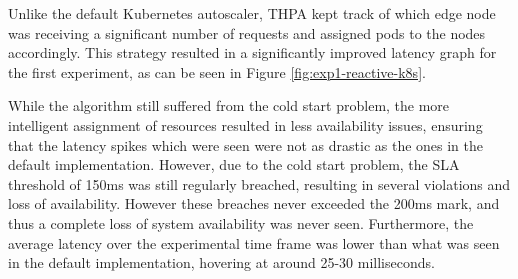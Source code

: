 \begin{center}
\begin{minipage}{\linewidth}
    \label{fig:exp1-reactive-k8s}
\end{minipage}
\end{center}

Unlike the default Kubernetes autoscaler, THPA kept track of which edge node was receiving a significant number of requests and assigned pods to the nodes accordingly. This strategy resulted in a significantly improved latency graph for the first experiment, as can be seen in Figure \ref{fig:exp1-reactive-k8s}.\par

While the algorithm still suffered from the cold start problem, the more intelligent assignment of resources resulted in less availability issues, ensuring that the latency spikes which were seen were not as drastic as the ones in the default implementation. However, due to the cold start problem, the SLA threshold of 150ms was still regularly breached, resulting in several violations and loss of availability. However these breaches never exceeded the 200ms mark, and thus a complete loss of system availability was never seen. Furthermore, the average latency over the experimental time frame was lower than what was seen in the default implementation, hovering at around 25-30 milliseconds.\par

